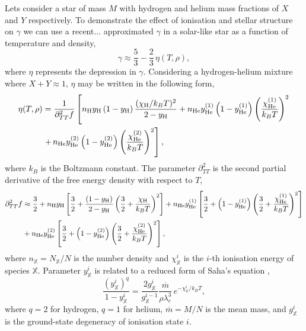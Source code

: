 Lets consider a star of mass \(M\) with hydrogen and helium mass fractions of \(X\) and \(Y\) respectively. To demonstrate the effect of ionisation and stellar structure on \(\gamma\) we can use a recent... \citet{Houdayer.Reese.ea2021} approximated \(\gamma\) in a solar-like star as a function of temperature and density,
%
\begin{equation}
    \gamma \approx \frac{5}{3} - \frac{2}{3} \, \eta(T, \rho), \label{eq:gamma1}
\end{equation}
%
where \(\eta\) represents the depression in \(\gamma\). Considering a hydrogen-helium mixture where \(X + Y \approx 1\), \(\eta\) may be written in the following form,
%
\begin{equation}
    \begin{split}
        \eta(T, \rho) &= \frac{1}{\partial_{TT}^2 f} \left[n_{{\mathrm{H}}} y_{{\mathrm{H}}} \, (1 - y_{{\mathrm{H}}}) \, \frac{(\chi_{{\mathrm{H}}} / k_B T)^2}{2 - y_{{\mathrm{H}}}}
        + n_{{\mathrm{He}}} y_{{\mathrm{He}}}^{(1)} \left(1 - y_{{\mathrm{He}}}^{(1)}\right) \left(\frac{\chi_{{\mathrm{He}}}^{(1)}}{k_B T}\right)^2 
        \right. \\ &\left.
        + \, n_{{\mathrm{He}}} y_{{\mathrm{He}}}^{(2)} \left(1 - y_{{\mathrm{He}}}^{(2)}\right) \left(\frac{\chi_{{\mathrm{He}}}^{(2)}}{k_B T}\right)^2\right],
    \end{split}
\end{equation}
%
where \(k_B\) is the Boltzmann constant. The parameter \(\partial_{TT}^2\) is the second partial derivative of the free energy density with respect to \(T\),
%
\begin{equation}
    \begin{split}
        \partial_{TT}^2 f &\approx \frac{3}{2} + n_\hydrogen y_\hydrogen \left[ \frac{3}{2} + \frac{(1 - y_\hydrogen)}{2 - y_\hydrogen} \left(\frac{3}{2} + \frac{\chi_\hydrogen}{k_B T}\right)^2 \right] %
        + n_\helium y_\helium^{(1)} \left[ \frac{3}{2} + \left(1 - y_\helium^{(1)}\right) \left(\frac{3}{2} + \frac{\chi_\helium^{(1)}}{k_B T}\right)^2 \right] \\
        &+ n_\helium y_\helium^{(2)} \left[ \frac{3}{2} + \left(1 - y_\helium^{(2)}\right) \left(\frac{3}{2} + \frac{\chi_\helium^{(2)}}{k_B T}\right)^2 \right],
    \end{split}
\end{equation}
%
where \(n_\mathbb{X} = N_\mathbb{X} / N\) is the number density and \(\chi_\mathbb{X}^{i}\) is the \(i\)-th ionisation energy of species \(\mathbb{X}\). Parameter \(y_\mathbb{X}^i\) is related to a reduced form of Saha's equation \needcite,
%
\begin{equation}
    \frac{(y_\mathbb{X}^i)^q}{1 - y_\mathbb{X}^i} = \frac{2 g_\mathbb{X}^i}{g_\mathbb{X}^{i-1}} \frac{\overline{m}}{\rho \lambda_e^3} \, e^{- \chi_\mathbb{X}^i / k_B T},
\end{equation}
%
where \(q = 2\) for hydrogen, \(q = 1\) for helium, \(\overline{m} = M/N\) is the mean mass, and \(g_\mathbb{X}^i\) is the ground-state degeneracy of ionisation state \(i\). 

